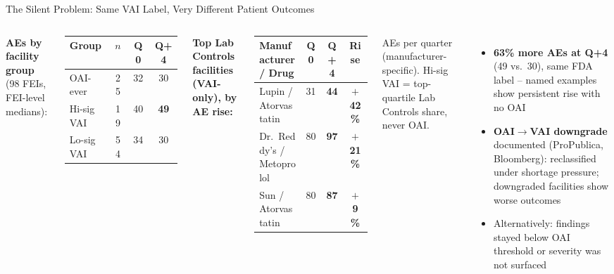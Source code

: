 \documentclass[aspectratio=169,10pt]{beamer}
\newcommand{\highlight}[1]{{\color{ncsuRed}\textbf{#1}}}
\begin{document}
\begin{frame}{The Silent Problem: Same VAI Label, Very Different Patient Outcomes}
\begin{columns}[T]
{\small \textbf{AEs by facility group} (98 FEIs, FEI-level medians):}

\vspace{4pt}
{\scriptsize
\begin{tabular}{lccc}
\toprule
Group & $n$ & Q0 & Q+4 \\
\midrule
OAI-ever & 25 & 32 & 30 \\
\rowcolor{techBlue!12}
Hi-sig VAI & 19 & 40 & \highlight{49} \\
Lo-sig VAI & 54 & 34 & 30 \\
\bottomrule
\end{tabular}
}

\vspace{14pt}
\pause
{\small \textbf{Top Lab Controls facilities (VAI-only), by AE rise:}}

\vspace{4pt}
{\scriptsize
\begin{tabular}{lccc}
\toprule
Manufacturer / Drug & Q0 & Q+4 & Rise \\
\midrule
Lupin / Atorvastatin      & 31 & \highlight{44} & \highlight{$+$42\%} \\
Dr.\ Reddy's / Metoprolol & 80 & \highlight{97} & \highlight{$+$21\%} \\
Sun / Atorvastatin        & 80 & \highlight{87} & \highlight{$+$9\%}  \\
\bottomrule
\end{tabular}
}

\vspace{3pt}
{\scriptsize AEs per quarter (manufacturer-specific). Hi-sig VAI = top-quartile Lab Controls share, never OAI.}

\begin{itemize}
  \setlength{\itemsep}{9pt}
  \item \textbf{63\% more AEs at Q+4} (49 vs.\ 30), same FDA label -- named examples show persistent rise with no OAI
  \pause
  \item \textbf{OAI$\to$VAI downgrade} documented (ProPublica, Bloomberg): reclassified under shortage pressure; downgraded facilities show worse outcomes
  \pause
  \item Alternatively: findings stayed below OAI threshold or severity was not surfaced
\end{itemize}
\end{columns}
\end{frame}
\end{document}
